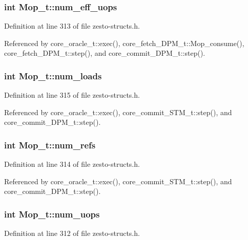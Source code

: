 \subsubsection[{num\_\-eff\_\-uops}]{\setlength{\rightskip}{0pt plus 5cm}int {\bf Mop\_\-t::num\_\-eff\_\-uops}}\label{structMop__t_e76ae084a61689a2170b98ffd872a6a3}




Definition at line 313 of file zesto-structs.h.

Referenced by core\_\-oracle\_\-t::exec(), core\_\-fetch\_\-DPM\_\-t::Mop\_\-consume(), core\_\-fetch\_\-DPM\_\-t::step(), and core\_\-commit\_\-DPM\_\-t::step().
\subsubsection[{num\_\-loads}]{\setlength{\rightskip}{0pt plus 5cm}int {\bf Mop\_\-t::num\_\-loads}}\label{structMop__t_52274c64edc3d83425766a0f8cdd71df}




Definition at line 315 of file zesto-structs.h.

Referenced by core\_\-oracle\_\-t::exec(), core\_\-commit\_\-STM\_\-t::step(), and core\_\-commit\_\-DPM\_\-t::step().
\subsubsection[{num\_\-refs}]{\setlength{\rightskip}{0pt plus 5cm}int {\bf Mop\_\-t::num\_\-refs}}\label{structMop__t_f0c857b3ff34e7bac381f3999036c251}




Definition at line 314 of file zesto-structs.h.

Referenced by core\_\-oracle\_\-t::exec(), core\_\-commit\_\-STM\_\-t::step(), and core\_\-commit\_\-DPM\_\-t::step().
\subsubsection[{num\_\-uops}]{\setlength{\rightskip}{0pt plus 5cm}int {\bf Mop\_\-t::num\_\-uops}}\label{structMop__t_b63d1f53be60fd17e64b2e6fe22e6f3b}




Definition at line 312 of file zesto-structs.h.

